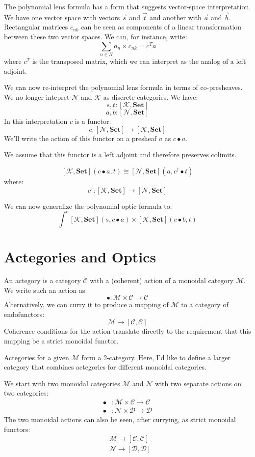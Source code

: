\documentclass[11pt]{amsart}
\newcommand{\cat}[1]{\mathcal{#1}}%
\newcommand{\Cat}[1]{\mathbf{#1}}%
\newcommand{\Set}{\Cat{Set}}
\begin{document}
The polynomial lens formula has a form that suggests vector-space interpretation. We have one vector space with vectors $\vec{s}$ and $\vec{t}$ and another with $\vec{a}$ and $\vec{b}$. Rectangular matrices $c_{n k}$ can be seen as components of a linear transformation between these two vector spaces. We can, for instance, write:
\[  \sum_{n \in N} a_n \times c_{n k} = c^T a \]
where $c^T$ is the transposed matrix, which we can interpret as the analog of a left adjoint. 

We can now re-interpret the polynomial lens formula in terms of co-presheaves. We no longer intepret $\cat N$ and $\cat K$ as discrete categories. We have:
\[ s, t \colon [\cat K, \Set] \]
\[a, b \colon [\cat N, \Set] \]
In this interpretation $c$ is a functor:
\[ c \colon [\cat N, \Set] \to [\cat K, \Set] \]
We'll write the action of this functor on a presheaf $a$ as $c \bullet a$.

We assume that this functor is a left adjoint and therefore preserves colimits. 

\[ [\cat K, \Set] (c \bullet a, t) \cong [\cat N, \Set] (a, c^{\dagger} \bullet t) \]
where:
\[ c^{\dagger} \colon [\cat K, \Set] \to [\cat N, \Set] \]

We can now generalize the polynomial optic formula to:
\[ \int^{c} 
 [\cat K, \Set] \left(s,  c \bullet a \right) \times 
 [\cat K, \Set] \left(c \bullet b, t \right) \]


\section{Actegories and Optics}

An actegory is a category $\cat C$ with a (coherent) action of a monoidal category $\cat M$. We write such an action as:
\[ \bullet \colon \cat M \times \cat C \to \cat C \]
Alternatively, we can curry it to produce a mapping of $\cat M$ to a category of endofunctors:
\[ \cat M \to [\cat C, \cat C] \]
Coherence conditions for the action translate directly to the requirement that this mapping be a strict monoidal functor. 




Actegories for a given $\cat M$ form a 2-category. Here, I'd like to define a larger category that combines actegories for different monoidal categories.

We start with two monoidal categories $\cat M$ and $\cat N$ with two separate actions on two categories:
\begin{align*} 
\bullet &\colon \cat M \times \cat C \to \cat C 
\\
 \bullet &\colon \cat N \times \cat D \to \cat D 
\end{align*}
The two monoidal actions can also be seen, after currying, as strict monoidal functors:
\begin{align*}
&\cat M \to [\cat C, \cat C]
\\
&\cat N \to [\cat D, \cat D]
\end{align*}
\end{document}
